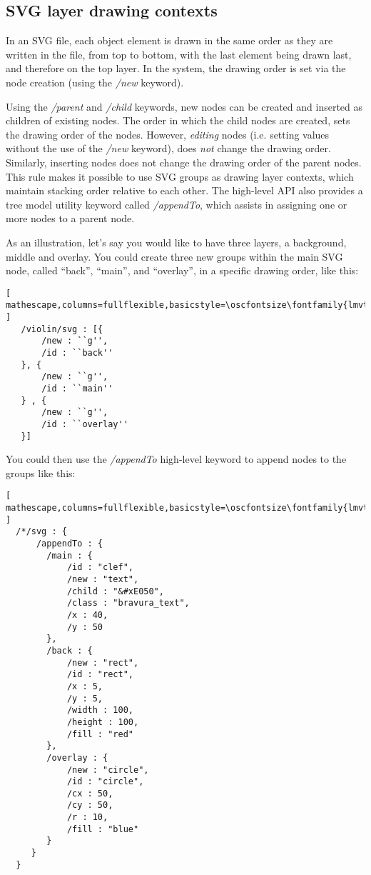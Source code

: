 \subsection{SVG layer drawing contexts}\label{sec:contexts}
In an SVG file, each object element is drawn in the same order as they are written in the file, from top to bottom, with the last element being drawn last, and therefore on the top layer.
In the \drawsocket system, the drawing order is set via the node creation (using the \textit{/new} keyword).

Using the \textit{/parent} and \textit{/child} keywords, new nodes can be created and inserted as children of existing nodes.
The order in which the child nodes are created, sets the drawing order of the nodes.
However, \textit{editing} nodes (i.e. setting values without the use of the \textit{/new} keyword), does \textit{not} change the drawing order.
Similarly, inserting nodes does not change the drawing order of the parent nodes.
This rule makes it possible to use SVG groups as drawing layer contexts, which maintain stacking order relative to each other.
The high-level API also provides a tree model utility keyword called \textit{/appendTo}, which assists in assigning one or more nodes to a parent node.

As an illustration, let's say you would like to have three layers, a background, middle and overlay. 
You could create three new groups within the main SVG node, called ``back'', ``main'', and ``overlay'', in a specific drawing order, like this:

\begin{lstlisting}[ mathescape,columns=fullflexible,basicstyle=\oscfontsize\fontfamily{lmvtt}\selectfont ]
   /violin/svg : [{
       /new : ``g'',
       /id : ``back''
   }, {
       /new : ``g'',
       /id : ``main''
   } , {
       /new : ``g'',
       /id : ``overlay''
   }]
\end{lstlisting}

You could then use the  \textit{/appendTo} high-level keyword to append nodes to the groups like this:

\begin{minipage}{\linewidth}
\begin{lstlisting}[ mathescape,columns=fullflexible,basicstyle=\oscfontsize\fontfamily{lmvtt}\selectfont ]
  /*/svg : {
      /appendTo : {
        /main : {
            /id : "clef",
            /new : "text",
            /child : "&#xE050",
            /class : "bravura_text",
            /x : 40,
            /y : 50
        },
        /back : {
            /new : "rect",
            /id : "rect",
            /x : 5,
            /y : 5,
            /width : 100,
            /height : 100,
            /fill : "red"
        },
        /overlay : {
            /new : "circle",
            /id : "circle",
            /cx : 50,
            /cy : 50,
            /r : 10,
            /fill : "blue"
        }
     }
  } 
\end{lstlisting}
\end{minipage}


